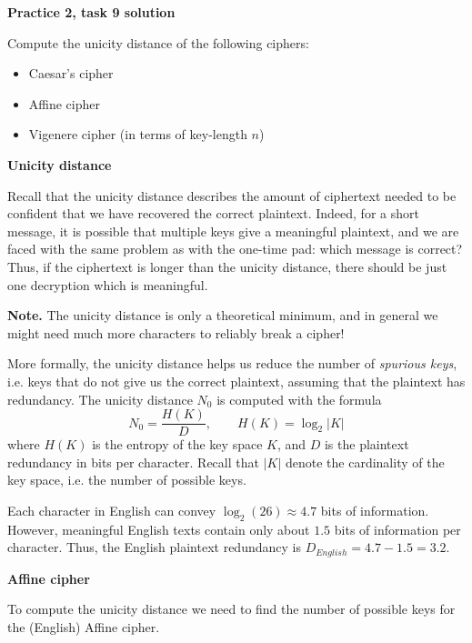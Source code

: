 \documentclass{practice}
\begin{document}
\begin{center}
  \textbf{Practice 2, task 9 solution}
\end{center}

Compute the unicity distance of the following ciphers:
\begin{itemize}
  \item Caesar's cipher
  \item Affine cipher
  \item Vigenere cipher (in terms of key-length $n$)
\end{itemize}

\vspace*{1em}

\textbf{Unicity distance}

Recall that the unicity distance describes the amount of ciphertext needed to be confident that we have recovered the correct plaintext.
Indeed, for a short message, it is possible that multiple keys give a meaningful plaintext, and we are faced with the same problem as with the one-time pad: which message is correct?
Thus, if the ciphertext is longer than the unicity distance, there should be just one decryption which is meaningful.

\textbf{Note.}
The unicity distance is only a theoretical minimum, and in general we might need much more characters to reliably break a cipher!

More formally, the unicity distance helps us reduce the number of \emph{spurious keys}, i.e. keys that do not give us the correct plaintext, assuming that the plaintext has redundancy.
The unicity distance $N_0$ is computed with the formula
\[
  N_0 = \frac{H(K)}{D},\qquad
  H(K) = \log_2{\lvert K \rvert}
\]
where $H(K)$ is the entropy of the key space $K$, and $D$ is the plaintext redundancy in bits per character.
Recall that $\lvert K\rvert$ denote the cardinality of the key space, i.e. the number of possible keys.

Each character in English can convey $\log_2(26) \approx 4.7$ bits of information.
However, meaningful English texts contain only about $1.5$ bits of information per character.
Thus, the English plaintext redundancy is $D_\mathit{English} = 4.7 - 1.5 = 3.2$.

\textbf{Affine cipher}

To compute the unicity distance we need to find the number of possible keys for the (English) Affine cipher.
\end{document}
